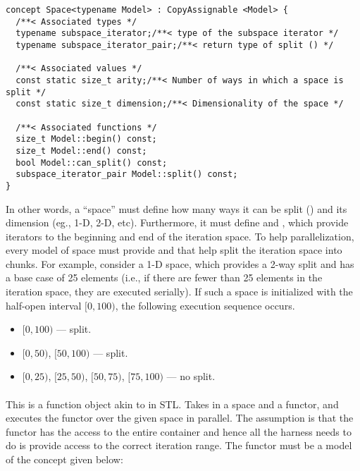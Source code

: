 \begin{center}
\begin{minipage}{0.7\textwidth}
\begin{lstlisting}
concept Space<typename Model> : CopyAssignable <Model> {
  /**< Associated types */
  typename subspace_iterator;/**< type of the subspace iterator */
  typename subspace_iterator_pair;/**< return type of split () */
  
  /**< Associated values */
  const static size_t arity;/**< Number of ways in which a space is split */
  const static size_t dimension;/**< Dimensionality of the space */

  /**< Associated functions */
  size_t Model::begin() const;
  size_t Model::end() const;
  bool Model::can_split() const;
  subspace_iterator_pair Model::split() const;
}
\end{lstlisting}
\end{minipage}
\end{center}

In other words, a ``space'' must define how many ways it can be split
() and its dimension (eg., 1-D, 2-D, etc).
%
Furthermore, it must define  and , which provide 
iterators to the beginning and end of the iteration space.
%
To help parallelization, every model of space must provide 
and  that help split the iteration space into  chunks.
%
For example, consider a 1-D space, which provides a 2-way split and has a 
base case of 25 elements (i.e., if there are fewer than 25 elements in the 
iteration space, they are executed serially).
%
If such a space is initialized with the half-open interval $[0, 100)$, the 
following execution sequence occurs.

\begin{center}
\begin{minipage}{0.6\textwidth}
\begin{itemize}
\item[] $[0,100)$ --- split.
\item[] $[0,50)$, $[50,100)$ --- split.
\item[] $[0,25)$, $[25,50)$, $[50,75)$, $[75,100)$ --- no split.
\end{itemize}
\end{minipage}
\end{center}

\paragraph{} This is a function object akin to 
 in STL.
%
 Takes in a space and a functor, and executes the 
functor over the given space in parallel.
%
The assumption is that the functor has the access to the entire container
and hence all the harness needs to do is provide access to the correct 
iteration range.
%
The functor must be a model of the  concept given below:

